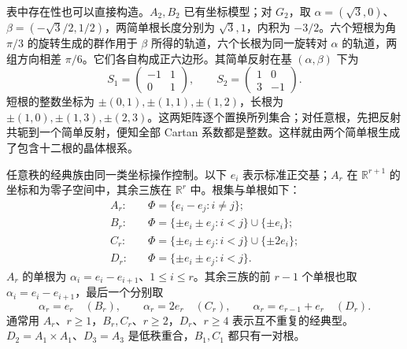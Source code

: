 表中存在性也可以直接构造。\(A_2,B_2\) 已有坐标模型；对 \(G_2\)，取 \(\alpha=(\sqrt3,0)\)、\(\beta=(-\sqrt3/2,1/2)\)，两简单根长度分别为 \(\sqrt3,1\)，内积为 \(-3/2\)。六个短根为角 \(\pi/3\) 的旋转生成的群作用于 \(\beta\) 所得的轨道，六个长根为同一旋转对 \(\alpha\) 的轨道，两组方向相差 \(\pi/6\)。它们各自构成正六边形。其简单反射在基 \((\alpha,\beta)\) 下为
\[
	S_1=\begin{pmatrix}-1&1\\0&1\end{pmatrix},\qquad
	S_2=\begin{pmatrix}1&0\\3&-1\end{pmatrix}.
\]
短根的整数坐标为 \(\pm(0,1),\pm(1,1),\pm(1,2)\)，长根为 \(\pm(1,0),\pm(1,3),\pm(2,3)\)。这两矩阵逐个置换所列集合；对任意根，先把反射共轭到一个简单反射，便知全部 Cartan 系数都是整数。这样就由两个简单根生成了包含十二根的晶体根系。

\ProseParagraphBreak

任意秩的经典族由同一类坐标操作控制。以下 \(e_i\) 表示标准正交基；\(A_r\) 在 \(\mathbb R^{r+1}\) 的坐标和为零子空间中，其余三族在 \(\mathbb R^r\) 中。根集与单根如下：
\[
	\begin{aligned}
		A_r:&\quad\Phi=\{e_i-e_j:i\ne j\};\\
		B_r:&\quad\Phi=\{\pm e_i\pm e_j:i<j\}\cup\{\pm e_i\};\\
		C_r:&\quad\Phi=\{\pm e_i\pm e_j:i<j\}\cup\{\pm2e_i\};\\
		D_r:&\quad\Phi=\{\pm e_i\pm e_j:i<j\}.
	\end{aligned}
\]
\(A_r\) 的单根为 \(\alpha_i=e_i-e_{i+1}\)、\(1\le i\le r\)。其余三族的前 \(r-1\) 个单根也取 \(\alpha_i=e_i-e_{i+1}\)，最后一个分别取
\[
	\alpha_r=e_r\quad(B_r),\qquad
	\alpha_r=2e_r\quad(C_r),\qquad
	\alpha_r=e_{r-1}+e_r\quad(D_r).
\]
通常用 \(A_r\)、\(r\ge1\)，\(B_r,C_r\)、\(r\ge2\)，\(D_r\)、\(r\ge4\) 表示互不重复的经典型。\(D_2=A_1\times A_1\)、\(D_3=A_3\) 是低秩重合，\(B_1,C_1\) 都只有一对根。

